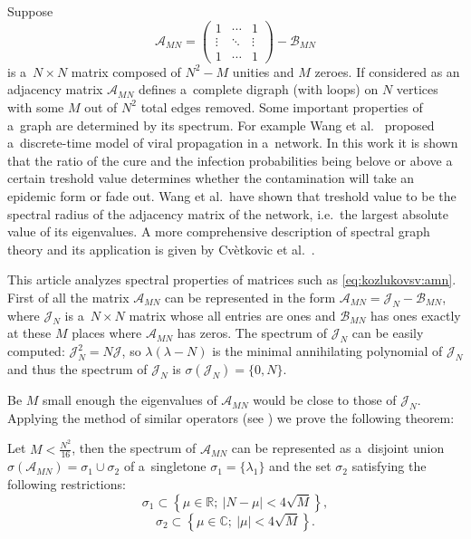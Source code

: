 Suppose
\begin{equation}\label{eq:kozlukovsv:amn}
    \mathscr{A}_{MN} =
    \begin{pmatrix}
        1 & \cdots & 1 \\
        \vdots & \ddots & \vdots \\
        1 & \cdots & 1
    \end{pmatrix} - \mathscr{B}_{MN}
\end{equation}
    is a~\( N\times N \) matrix composed of
    \( N^2 - M \) unities and \( M \) zeroes.
If considered as an adjacency matrix \( \mathscr{A}_{MN} \)
    defines a~complete digraph (with loops) on \( N \) vertices
    with some \( M \) out of \( N^2 \) total edges removed.
Some important properties of a~graph are determined by its spectrum.
For example Wang et al.\ \cite{epidemic} proposed a~discrete-time model
    of viral propagation in a~network.
In this work it is shown that the ratio
    of the cure and the infection probabilities
    being belove or above a certain treshold value
    determines whether the contamination will take an epidemic form
    or fade out.
Wang et al.\ have shown that treshold value
    to be the spectral radius of the adjacency matrix of the network,
    i.e.\ the largest absolute value of its eigenvalues.
A more comprehensive description of spectral graph theory
    and its application is given by Cv\`etkovic et al.\ \cite{cvet}.

This article analyzes spectral properties of matrices such as \eqref{eq:kozlukovsv:amn}.
First of all the matrix \( \mathscr{A}_{MN} \) can be represented in the form
    \( \mathscr{A}_{MN} = \mathcal{J}_N - \mathscr{B}_{MN} \),
    where \( \mathcal{J}_N \) is a~\( N\times N \) matrix
    whose all entries are ones
    and \( \mathcal{B}_{MN} \) has ones exactly at these \( M \)
    places where \( \mathscr{A}_{MN} \) has zeros.
The spectrum of \( \mathcal{J}_N \) can be easily computed:
    \( \mathcal{J}_N^2 = N \mathcal{J} \),
    so \( \lambda(\lambda - N) \) is the minimal
    annihilating polynomial of \( \mathcal{J}_N \)
    and thus the spectrum of \( \mathcal{J}_{N} \) is
    \( \sigma(\mathcal{J}_N) = \{ 0,N \} \).

Be \( M \) small enough
    the eigenvalues of \( \mathscr{A}_{MN} \) would be close to those of \( \mathcal{J}_N \).
Applying the method of similar operators (see \cite{baskakov-harmonic,baskakov-split})
    we prove the following theorem:
\begin{thm}\label{kozlukovsv:thm:almost-all-ones}
    Let \( M < \frac{N^2}{16} \),
    then the spectrum of \( \mathscr{A}_{MN} \)
    can be represented as a~disjoint union
    \( \sigma\left(\mathscr{A}_{MN}\right) = \sigma_1 \cup \sigma_2 \)
    of a~singletone \( \sigma_1=\{\lambda_1\} \)
    and the set \( \sigma_2 \) satisfying the following restrictions:
    \[
        \sigma_1 \subset \left\{
            \mu\in\mathbb{R};\ \lvert N - \mu \rvert < 4\sqrt{M}
            \right\},
        \]
    \[ \sigma_2 \subset \left\{ \mu\in\mathbb{C};\ \lvert \mu \rvert < 4\sqrt{M} \right\}. \]
\end{thm}


